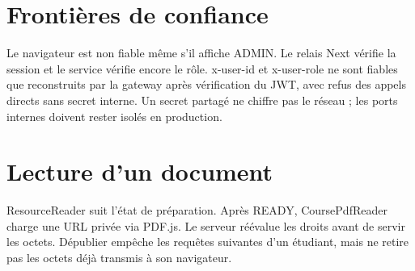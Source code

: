 \section{Frontières de confiance}
Le navigateur est non fiable même s’il affiche ADMIN. Le relais Next vérifie la session et le service vérifie encore le rôle. x-user-id et x-user-role ne sont fiables que reconstruits par la gateway après vérification du JWT, avec refus des appels directs sans secret interne. Un secret partagé ne chiffre pas le réseau ; les ports internes doivent rester isolés en production.

\section{Lecture d’un document}
ResourceReader suit l’état de préparation. Après READY, CoursePdfReader charge une URL privée via PDF.js. Le serveur réévalue les droits avant de servir les octets. Dépublier empêche les requêtes suivantes d’un étudiant, mais ne retire pas les octets déjà transmis à son navigateur.
